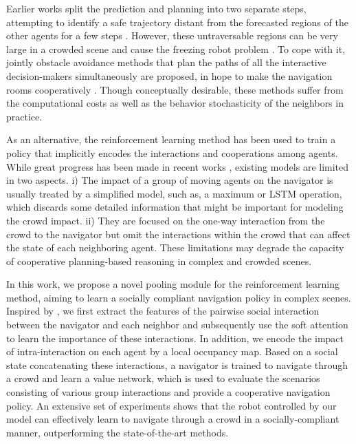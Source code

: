 \documentclass[letterpaper, 10 pt, conference]{ieeeconf}  %
\begin{document}
Earlier works split the prediction and planning into two separate steps, attempting to identify a safe trajectory distant from the forecasted regions of the other agents for a few steps \cite{bennewitz_learning_2005,aoude_probabilistically_2013}. However, these untraversable regions can be very large in a crowded scene and cause the freezing robot problem \cite{trautman_unfreezing_2010}. To cope with it, jointly obstacle avoidance methods that plan the paths of all the interactive decision-makers simultaneously are proposed, in hope to make the navigation rooms cooperatively \cite{trautman_unfreezing_2010}. Though conceptually desirable, these methods suffer from the computational costs as well as the behavior stochasticity of the neighbors in practice. 

As an alternative, the reinforcement learning method has been used to train a policy that implicitly encodes the interactions and cooperations among agents. While great progress has been made in recent works \cite{chen_decentralized_2016,chen_socially_2017,long_towards_2017,everett_motion_2018}, existing models are limited in two aspects. i) The impact of a group of moving agents on the navigator is usually treated by a simplified model, such as, a maximum or LSTM operation, which discards some detailed information that might be important for modeling the crowd impact. ii) They are focused on the one-way interaction from the crowd to the navigator but omit the interactions within the crowd that can affect the state of each neighboring agent. These limitations may degrade the capacity of cooperative planning-based reasoning in complex and crowded scenes. 

In this work, we propose a novel pooling module for the reinforcement learning method, aiming to learn a socially compliant navigation policy in complex scenes. Inspired by \cite{alahi_social_2016,gupta_social_2018,vemula_social_2017}, we first extract the features of the pairwise social interaction between the navigator and each neighbor and subsequently use the soft attention to learn the importance of these interactions. In addition, we encode the impact of intra-interaction on each agent by a local occupancy map. Based on a social state concatenating these interactions, a navigator is trained to navigate through a crowd and learn a value network, which is used to evaluate the scenarios consisting of various group interactions and provide a cooperative navigation policy. An extensive set of experiments shows that the robot controlled by our model can effectively learn to navigate through a crowd in a socially-compliant manner, outperforming the state-of-the-art methods. 
\end{document}
